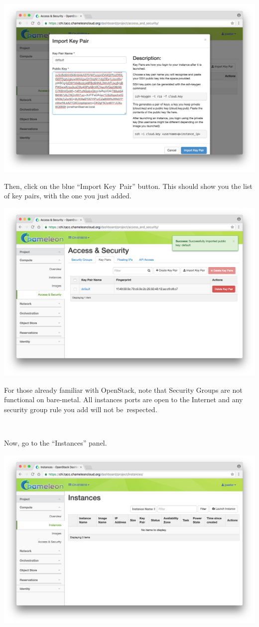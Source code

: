 \includegraphics[width=0.8\columnwidth]{images/chameleon/Screen-Shot-2016-10-26-at-14-37-18.png}

Then, click on the blue ``Import Key~Pair'' button. This should show you
the list of key pairs, with the one you just added.

\includegraphics[width=0.8\columnwidth]{images/chameleon/Screen-Shot-2016-10-26-at-14-37-52.png}

For those already familiar with OpenStack, note that Security Groups are
not functional on bare-metal. All instances ports are open to the
Internet and any security group rule you add will not be~respected.

~

Now, go to the ``Instances'' panel.

\includegraphics[width=0.8\columnwidth]{images/chameleon/Screen-Shot-2016-10-26-at-14-39-56.png}

